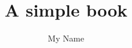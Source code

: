 \documentclass{book}
\begin{document}
\title{\textbf{A simple book}}
\author{My Name}

\maketitle

\tableofcontents





\end{document}
